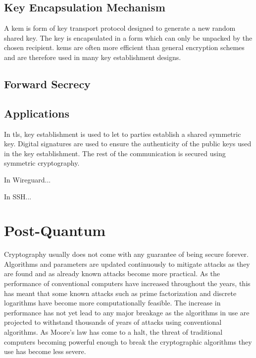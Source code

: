 \subsection{Key Encapsulation Mechanism}

A \gls{kem} is form of key transport protocol designed to generate a new random shared key. The key is encapsulated in a form which can only be unpacked by the chosen recipient. \glspl{kem} are often more efficient than general encryption schemes and are therefore used in many key establishment designs\cite{boyd2020:key-encapsulation}.


\subsection{Forward Secrecy}

\subsection{Applications}

In \gls{tls}, key establishment is used to let to parties establish a shared symmetric key. Digital signatures are used to ensure the authenticity of the public keys used in the key establishment. The rest of the communication is secured using symmetric cryptography\cite{bernstein2017}.

In Wireguard...

In SSH...

\section{Post-Quantum}

Cryptography usually does not come with any guarantee of being secure forever. Algorithms and parameters are updated continuously to mitigate attacks as they are found and as already known attacks become more practical. As the performance of conventional computers have increased throughout the years, this has meant that some known attacks such as prime factorization and discrete logarithms have become more computationally feasible. The increase in performance has not yet lead to any major breakage as the algorithms in use are projected to withstand thousands of years of attacks using conventional algorithms. As Moore's law has come to a halt, the threat of traditional computers becoming powerful enough to break the cryptographic algorithms they use has become less severe.

